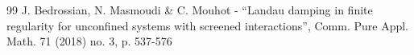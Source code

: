 \documentclass[10pt,a4paper]{article}
\theoremstyle{plain}
\theoremstyle{remark}
\begin{document}
\begin{thebibliography}{99}
 J. Bedrossian, N. Masmoudi \& C. Mouhot - “Landau damping in finite regularity for unconfined systems with screened interactions”, Comm. Pure Appl. Math. 71 (2018) no. 3, p. 537-576
\end{thebibliography}
\end{document}
